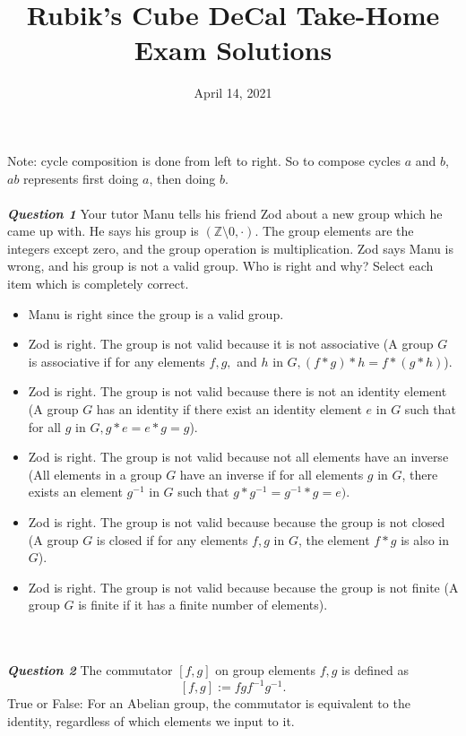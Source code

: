 \documentclass{article}
\title{Rubik's Cube DeCal Take-Home Exam Solutions}
\author{April 14, 2021}
\date{}
\begin{document}
\maketitle

Note: cycle composition is done from left to right. So to compose cycles $a$ and $b$, $ab$ represents first doing $a$, then doing $b$. 
\\\\
\textbf{\textit{Question 1}}
Your tutor Manu tells his friend Zod about a new group which he came up with. He says his group is $(\mathbb{Z} \setminus 0, \cdot).$ The group elements are the integers except zero, and the group operation is multiplication. Zod says Manu is wrong, and his group is not a valid group. Who is right and why? Select each item which is completely correct.
\begin{itemize}
    \item Manu is right since the group is a valid group.
    \item Zod is right. The group is not valid because it is not associative (A group $G$ is associative if for any elements $f, g,$ and $h$ in $G, (f * g) * h = f * (g * h)$).
    \item Zod is right. The group is not valid because there is not an identity element (A group $G$ has an identity if there exist an identity element $e$ in $G$ such that for all $g$ in $G, g * e = e * g = g$).
    \item Zod is right. The group is not valid because not all elements have an inverse (All elements in a group $G$ have an inverse if for all elements $g$ in $G$, there exists an element $g^{-1}$ in $G$ such that $g * g^{-1} = g^{-1} * g = e).$
    \item Zod is right. The group is not valid because because the group is not closed (A group $G$ is closed if for any elements $f, g$ in $G$, the element $f * g$ is also in $G$). 
    \item Zod is right. The group is not valid because because the group is not finite (A group $G$ is finite if it has a finite number of elements). 
\end{itemize}
\\\\
\textbf{\textit{Question 2}}
The commutator $[f, g]$ on group elements $f, g$ is defined as $$[f, g] := fgf^{-1}g^{-1}.$$ True or False: For an Abelian group, the commutator is equivalent to the identity, regardless of which elements we input to it.
\end{document}
